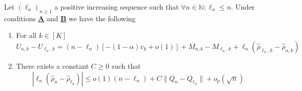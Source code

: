 \begin{lemma}\label{lem:diff-U-approx}
	Let $(\ell_n)_{n \geq 1}$ a positive increasing sequence such that $\forall n \in \mathbb{N}: \ell_n \leq n$. Under conditions \hyperlink{CA}{\textbf{A}} and \hyperlink{CB}{\textbf{B}} we have the following
	\begin{enumerate}[label=(\roman*)]
		\item For all \(k \in [K]\) 
		\begin{equation}\label{eq:prelim-2}
			U_{n,k} - U_{\ell_{n},k} = (n - \ell_{n})[-(1 - \alpha)v_k + o(1)] + M_{n,k} - M_{\ell_{n},k} + \ell_{n} (\hat{\rho}_{\ell_{n},k} - \hat{\rho}_{n,k})
		\end{equation}
		\item There exists a constant \(C \geq 0\) such that
		\begin{equation}\label{eq:prelim-22}
			|\ell_n(\hat{\rho}_n - \hat{\rho}_{\ell_n})| \le o(1)(n-\ell_n) + C\|Q_n - Q_{\ell_n}\|  + o_p(\sqrt{n})
		\end{equation}		
	\end{enumerate}
\end{lemma}
